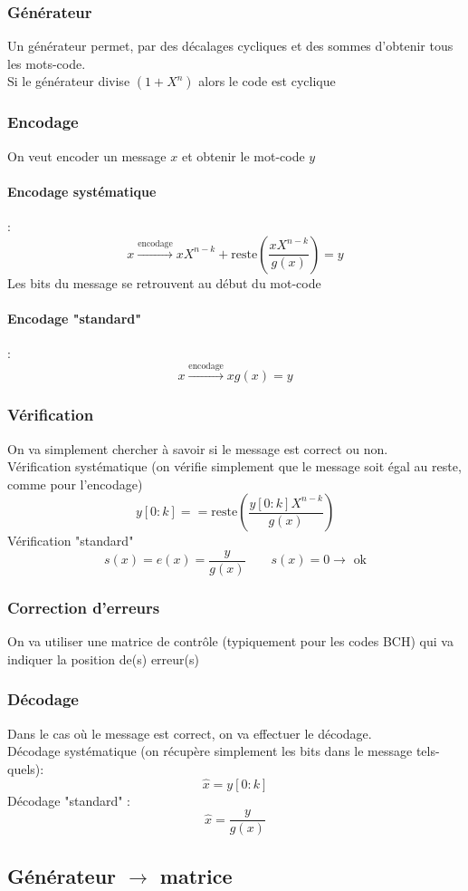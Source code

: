 \documentclass[resume.tex]{subfiles}
\begin{document}
\subsubsection{Générateur}
Un générateur permet, par des décalages cycliques et des sommes d'obtenir tous les mots-code.\\
Si le générateur divise $(1+X^n)$ alors le code est cyclique
\subsubsection{Encodage}
On veut encoder un message $x$ et obtenir le mot-code $y$
\paragraph{Encodage systématique} :
$$x\xrightarrow{\text{encodage}} xX^{n-k}+\text{reste}\left(\frac{xX^{n-k}}{g(x)}\right)=y$$
Les bits du message se retrouvent au début du mot-code
\paragraph{Encodage "standard"} :
$$x\xrightarrow{\text{encodage}} xg(x)=y$$
\subsubsection{Vérification}
On va simplement chercher à savoir si le message est correct ou non.\\
Vérification systématique (on vérifie simplement que le message soit égal au reste, comme pour l'encodage)
$$y[0:k] == \text{reste}\left(\frac{y[0:k]X^{n-k}}{g(x)}\right)$$
Vérification "standard"
$$s(x)=e(x)=\frac{y}{g(x)}\qquad s(x)=0\longrightarrow\text{ ok}$$
\subsubsection{Correction d'erreurs}
On va utiliser une matrice de contrôle (typiquement pour les codes BCH) qui va indiquer la position de(s) erreur(s)
\subsubsection{Décodage}
Dans le cas où le message est correct, on va effectuer le décodage.\\
Décodage systématique (on récupère simplement les bits dans le message tels-quels):
$$\hat{x}=y[0:k]$$
Décodage "standard" :
$$\hat{x}=\frac{y}{g(x)}$$
\subsection{Générateur $\longrightarrow $ matrice}
\end{document}
